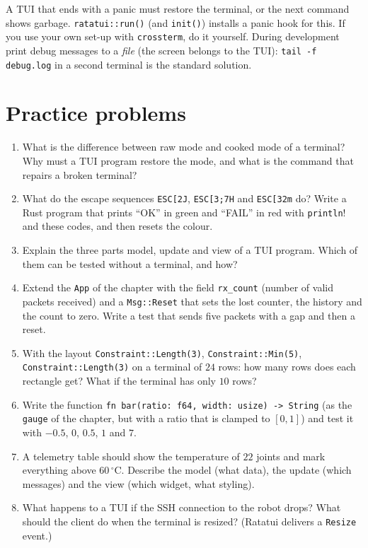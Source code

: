 \begin{aibox}
A TUI that ends with a panic must restore the terminal, or the next command shows garbage. \verb!ratatui::run()! (and \verb!init()!) installs a panic hook for this. If you use your own set-up with \verb!crossterm!, do it yourself. During development print debug messages to a \emph{file} (the screen belongs to the TUI): \verb!tail -f debug.log! in a second terminal is the standard solution.
\end{aibox}

\section*{Practice problems}
\begin{enumerate}[label=\textbf{\thechapter.\arabic*}]
  \item What is the difference between raw mode and cooked mode of a terminal? Why must a TUI program restore the mode, and what is the command that repairs a broken terminal?
  \item What do the escape sequences \verb!ESC[2J!, \verb!ESC[3;7H! and \verb!ESC[32m! do? Write a Rust program that prints ``OK'' in green and ``FAIL'' in red with \verb!println!! and these codes, and then resets the colour.
  \item Explain the three parts model, update and view of a TUI program. Which of them can be tested without a terminal, and how?
  \item Extend the \verb!App! of the chapter with the field \verb!rx_count! (number of valid packets received) and a \verb!Msg::Reset! that sets the lost counter, the history and the count to zero. Write a test that sends five packets with a gap and then a reset.
  \item With the layout \verb!Constraint::Length(3)!, \verb!Constraint::Min(5)!, \verb!Constraint::Length(3)! on a terminal of $24$ rows: how many rows does each rectangle get? What if the terminal has only $10$ rows?
  \item Write the function \verb!fn bar(ratio: f64, width: usize) -> String! (as the \verb!gauge! of the chapter, but with a ratio that is clamped to $[0,1]$) and test it with $-0.5$, $0$, $0.5$, $1$ and $7$.
  \item A telemetry table should show the temperature of $22$ joints and mark everything above $60\,^\circ$C. Describe the model (what data), the update (which messages) and the view (which widget, what styling).
  \item What happens to a TUI if the SSH connection to the robot drops? What should the client do when the terminal is resized? (Ratatui delivers a \verb!Resize! event.)

\end{enumerate}

